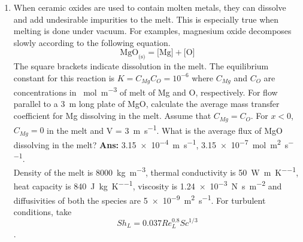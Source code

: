 \begin{enumerate}
\item When ceramic oxides are used to contain molten metals, they can dissolve and add undesirable impurities to the melt. This is especially true when melting is done under vacuum. For examples, magnesium oxide decomposes slowly according to the following equation.
$$ \text{MgO}_{\text{(s)}} = \text{[Mg]} + \text{[O]} $$
The square brackets indicate dissolution in the melt. The equilibrium constant for this reaction is $K = C_{Mg} C_O = 10^{-6}$ where $C_{Mg}$ and $C_O$ are concentrations in \SI{}{\mole\per\meter\cubed} of melt of Mg and O, respectively. For flow parallel to a \SI{3}{\meter} long plate of MgO, calculate the average mass transfer coefficient for Mg dissolving in the melt. Assume that $C_{Mg} = C_O$. For $x<0$, $C_{Mg}=0$ in the melt and V = \SI{3}{\meter\per\second}. What is the average flux of MgO dissolving in the melt? {\bf Ans:} \SI{3.15e-4}{\meter\per\second}, \SI{3.15e-7}{\mole\per\meter\squared\per\second}.\\
Density of the melt is \SI{8000}{\kilo\gram\per\meter\cubed}, thermal conductivity is \SI{50}{\watt\per\meter\per\kelvin}, heat capacity is \SI{840}{\joule\per\kilo\gram\per\kelvin}, viscosity is \SI{1.24e-3}{\newton\second\per\meter\squared} and diffusivities of both the species are \SI{5e-9}{\meter\squared\per\second}. For turbulent conditions, take $$ Sh_L = 0.037 Re_L^{0.8} Sc^{1/3}$$. 
\end{enumerate}
